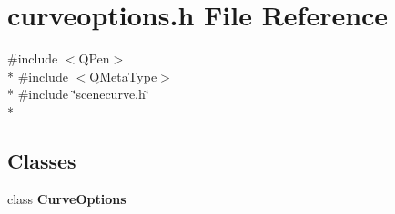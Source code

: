 \section{curveoptions.\+h File Reference}
\label{curveoptions_8h}
{\ttfamily \#include $<$Q\+Pen$>$}\\*
{\ttfamily \#include $<$Q\+Meta\+Type$>$}\\*
{\ttfamily \#include \char`\"{}scenecurve.\+h\char`\"{}}\\*
\subsection*{Classes}
\begin{DoxyCompactItemize}
\item 
class {\bf Curve\+Options}
\end{DoxyCompactItemize}
